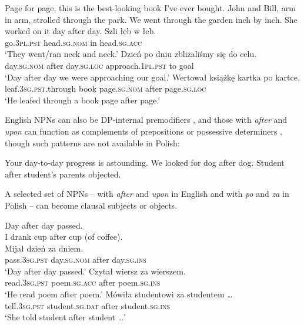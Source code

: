 \documentclass[output=paper]{langscibook}
\begin{document}
\ea \label{psk:ex:key:17}\ea Page for page, this is the best-looking book I’ve ever   bought.
\ex John and Bill, arm in arm, strolled through the park.
\ex We went through the garden inch by inch.
\ex She worked on it day after day.\z
\ex\label{psk:ex:key:12345} \ea \gll \label{psk:ex:key:18}Szli łeb w łeb.\\
      go.\textsc{3pl.pst}  head.\textsc{sg.nom} in head.\textsc{sg.acc}\\
\glt     ‘They went/ran neck and neck.’
\ex \gll  Dzień          po     dniu            zbliżaliśmy się     do celu.\\
      day.\textsc{sg.nom} after day.\textsc{sg.loc} approach.\textsc{1pl.pst} to goal\\
\glt     ‘Day after day we were approaching our goal.’
\ex\gll  Wertował                  książkę kartka           po     kartce.\\
      leaf.\textsc{3sg.pst}.through book page.\textsc{sg.nom} after page.\textsc{sg.loc}\\
\glt     ‘He leafed through a book page after page.’\hfill\citep[249]{Dobaczewski2018}\z
\z

\noindent English NPNs can also be DP-internal premodifiers , and those with \textit{after} and \textit{upon} can function as complements of prepositions   or possessive determiners  \citep[19]{Jackendoff2008}, though such patterns are not available in Polish:

\ea \label{psk:ex:key:19}  \ea\label{psk:ex:key:19a} Your day-to-day progress is astounding.
\ex\label{psk:ex:key:19b} We looked for dog after dog.
\ex\label{psk:ex:key:19c} Student after student’s parents objected.
\z\z

\noindent A selected set of NPNs – with \textit{after} and \textit{upon} in English and with \textit{po} and \textit{za} in Polish – can become clausal subjects or objects.

\ea \label{psk:ex:key:20}  \ea Day after day passed.\\
\ex I drank cup after cup (of coffee).\\
\z \ex \label{psk:ex:key:21}  \ea \gll Mijał dzień za dniem.\\
      pass.\textsc{3sg.pst} day.\textsc{sg.nom} after day.\textsc{sg.ins}\\
\glt      ‘Day after day passed.’
\ex \gll   Czytał wiersz za wierszem.\\
      read.\textsc{3sg.pst} poem.\textsc{sg.acc} after poem.\textsc{sg.ins}\\
\glt      ‘He read poem after poem.’
\ex \gll   Mówiła studentowi za studentem …\\
      tell.\textsc{3sg.pst} student.\textsc{sg.dat} after student.\textsc{sg.ins}\\
\glt      ‘She told student after student …’\z
\z
\end{document}
